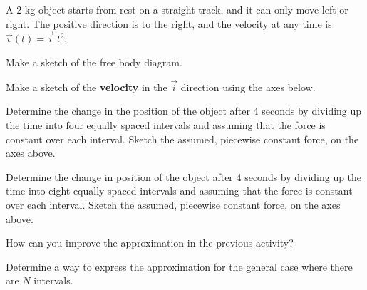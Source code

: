\begin{problem}
\item A 2 kg object starts from rest on a straight track, and it can
  only move left or right. The positive direction is to the right, and
  the velocity at any time is $\vec{v}(t)=\vec{i} \; t^2$.

  \begin{subproblem}
    \item Make a sketch of the free body diagram.
      \vspace{4em}
    \item Make a sketch of the \textbf{velocity} in the $\vec{i}$
      direction using the axes below.

      \scalebox{0.5}{}

    \item Determine the change in the position of the object after 4
      seconds by dividing up the time into four equally spaced
      intervals and assuming that the force is constant over each
      interval. Sketch the assumed, piecewise constant force, on the
      axes above.  
      \vfill
    \item Determine the change in position of the object after 4
      seconds by dividing up the time into eight equally spaced
      intervals and assuming that the force is constant over each
      interval. Sketch the assumed, piecewise constant force, on the
      axes above.
      \vfill
  \end{subproblem}
  \clearpage

\item How can you improve the approximation in the previous activity?
  \vspace{3em}

\item Determine a way to express the approximation for the general
  case where there are $N$ intervals.

  \vfill

\end{problem}

\postClass

